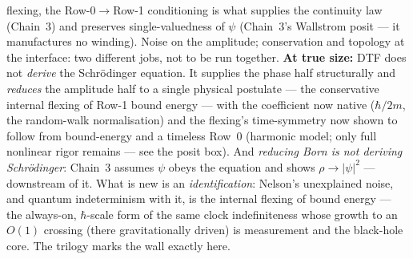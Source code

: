 \documentclass[11pt]{article}
\begin{document}
flexing, the Row-0$\to$Row-1 conditioning is what supplies the continuity law (Chain~3) and preserves
single-valuedness of $\psi$ (Chain~3's Wallstrom posit --- it manufactures no winding). Noise on the
amplitude; conservation and topology at the interface: two different jobs, not to be run together.
\smallskip
\noindent\textbf{At true size:} DTF does not \emph{derive} the Schr\"odinger equation. It supplies the
phase half structurally and \emph{reduces} the amplitude half to a single physical postulate --- the
conservative internal flexing of Row-1 bound energy --- with the coefficient now native ($\hbar/2m$, the
random-walk normalisation) and the flexing's time-symmetry now shown to follow from bound-energy and a
timeless Row~0 (harmonic model; only full nonlinear rigor remains --- see the posit box). And \emph{reducing Born
is not deriving Schr\"odinger}: Chain~3 assumes $\psi$ obeys the equation and shows $\rho\to|\psi|^2$ ---
downstream of it. What is new is an \emph{identification}: Nelson's unexplained noise, and quantum
indeterminism with it, is the internal flexing of bound energy --- the always-on, $\hbar$-scale form of the
same clock indefiniteness whose growth to an $O(1)$ crossing (there gravitationally driven) is measurement
and the black-hole core. The trilogy marks the wall exactly here.
\end{document}
